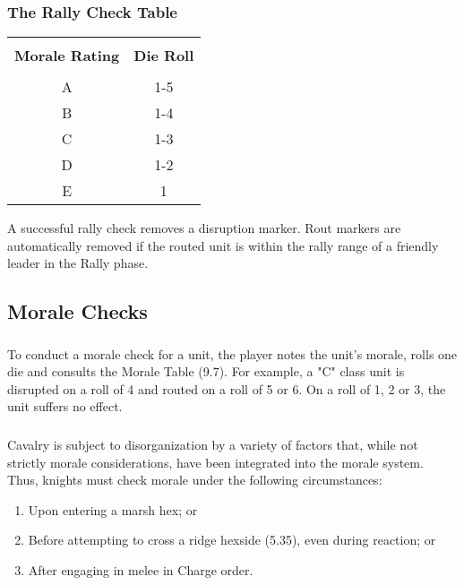 \begin{hangsubsubsection}
  \subsubsection{The Rally Check Table}
\end{hangsubsubsection}

\begin{tabular}{ |cc| }
    \hline & \\[-2.0ex]
    \textbf{Morale Rating} & {\textbf{Die Roll}} \\
    \hline & \\ [-2.0ex]
    A & 1-5 \\
    B & 1-4 \\
    C & 1-3 \\
    D & 1-2 \\
    E & 1 \\
    \hline
\end{tabular}

A successful rally check removes a disruption marker. Rout markers are automatically removed if the routed unit is within the rally range of a friendly leader in the Rally phase.

\subsection{Morale Checks}

\subsubsection[Conducting Morale Checks]{} To conduct a morale check for a unit, the player notes the unit's morale, rolls one die and consults the Morale Table (9.7). For example, a "C" class unit is disrupted on a roll of 4 and routed on a roll of 5 or 6. On a roll of 1, 2 or 3, the unit suffers no effect.

\subsubsection[Cavalry]{} Cavalry is subject to disorganization by a variety of factors that, while not strictly morale considerations, have been integrated into the morale system. Thus, knights must check morale under the following circumstances:

\begin{enumerate}
  \item Upon entering a marsh hex; or
  \item Before attempting to cross a ridge hexside (5.35), even during reaction; or
  \item After engaging in melee in Charge order.
\end{enumerate}

